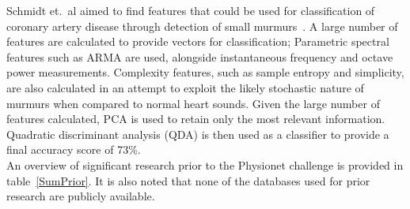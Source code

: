 \documentclass[titlepage, 12pt]{scrartcl} \usepackage{enumitem}
\begin{document}
Schmidt et.\ al aimed to find features that could be used for classification of
coronary artery disease through detection of small
murmurs~\parencite{Schmidt2015}. A large number of features are
calculated to provide vectors for classification; Parametric spectral features
such as ARMA are used, alongside instantaneous frequency and octave power
measurements. Complexity features, such as sample entropy and simplicity, are
also calculated in an attempt to exploit the likely stochastic nature of
murmurs when compared to normal heart sounds.  Given the large number of
features calculated, PCA is used to retain only the most relevant information.
Quadratic discriminant analysis (QDA) is then used as a classifier to provide a
final accuracy score of 73\%.\\

An overview of significant research prior to the Physionet challenge is
provided in table~\ref{SumPrior}. It is also noted that none of the databases
used for prior research are publicly available.
\end{document}
